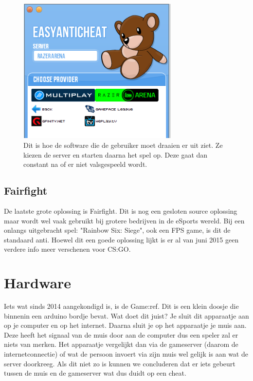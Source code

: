 \documentclass[pdftex,a4paper,12pt,twoside]{report}
\begin{document}
\begin{figure}[H]
\centering
\includegraphics[width=8cm]{img/eac}
\caption{Dit is hoe de software die de gebruiker moet draaien er uit ziet. Ze kiezen de server en starten daarna het spel op. Deze gaat dan constant na of er niet valsgespeeld wordt.} 
\end{figure}

\subsection{Fairfight}
\label{sec:fairfight}
De laatste grote oplossing is Fairfight. Dit is nog een gesloten source oplossing maar wordt wel vaak gebruikt bij grotere bedrijven in de eSports wereld. Bij een onlangs uitgebracht spel: "Rainbow Six: Siege", ook een FPS game, is dit de standaard \gls{anti}. Hoewel dit een goede oplossing lijkt is er al van juni 2015 geen verdere info meer verschenen voor CS:GO. 
\citep{fairfight}


\section{Hardware}
\label{sec:antihardware}
Iets wat sinds 2014 aangekondigd is, is de Game:ref. Dit is een klein doosje die binnenin een arduino bordje bevat. Wat doet dit juist? Je sluit dit apparaatje aan op je computer en op het internet. Daarna sluit je op het apparaatje je muis aan. Deze heeft het signaal van de muis door aan de computer dus een speler zal er niets van merken. 
Het apparaatje vergelijkt dan via de gameserver (daarom de internetconnectie) of wat de persoon invoert via zijn muis wel gelijk is aan wat de server doorkreeg. Als dit niet zo is kunnen we concluderen dat er iets gebeurt tussen de muis en de gameserver wat dus duidt op een \gls{cheat}. 
\\
\end{document}
